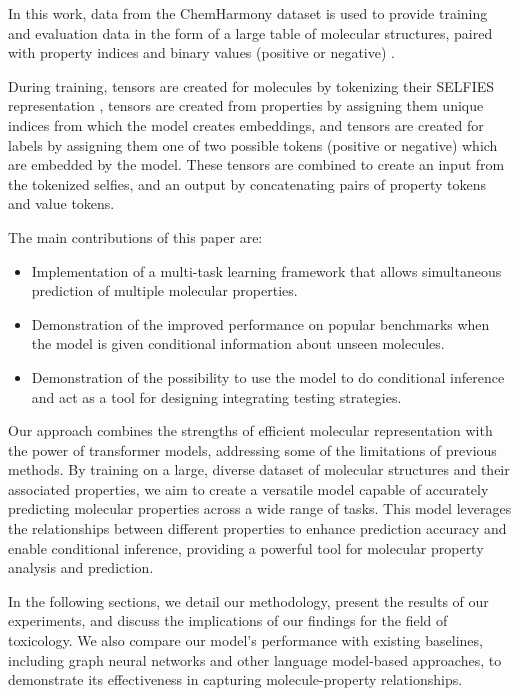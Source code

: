 In this work, data from the ChemHarmony dataset is used to provide training and evaluation data in the form of a large table of molecular structures, paired with property indices and binary values (positive or negative) \cite{biobricks}. 

During training, tensors are created for molecules by tokenizing their SELFIES representation \cite{selfies}, tensors are created from properties by assigning them unique indices from which the model creates embeddings, and tensors are created for labels by assigning them one of two possible tokens (positive or negative) which are embedded by the model. These tensors are combined to create an input from the tokenized selfies, and an output by concatenating pairs of property tokens and value tokens.

The main contributions of this paper are:

\begin{itemize}
    \item Implementation of a multi-task learning framework that allows simultaneous prediction of multiple molecular properties.
    \item Demonstration of the improved performance on popular benchmarks when the model is given conditional information about unseen molecules.
    \item Demonstration of the possibility to use the model to do conditional inference and act as a tool for designing integrating testing strategies.
\end{itemize}

Our approach combines the strengths of efficient molecular representation with the power of transformer models, addressing some of the limitations of previous methods. By training on a large, diverse dataset of molecular structures and their associated properties, we aim to create a versatile model capable of accurately predicting molecular properties across a wide range of tasks. This model leverages the relationships between different properties to enhance prediction accuracy and enable conditional inference, providing a powerful tool for molecular property analysis and prediction.

In the following sections, we detail our methodology, present the results of our experiments, and discuss the implications of our findings for the field of toxicology. We also compare our model's performance with existing baselines, including graph neural networks and other language model-based approaches, to demonstrate its effectiveness in capturing molecule-property relationships.